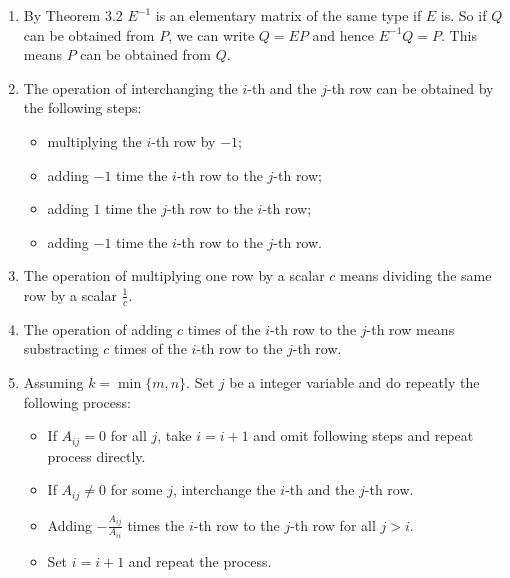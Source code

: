 \begin{enumerate}
\item By Theorem 3.2 $E^{-1}$ is an elementary matrix of the same type if $E$ is. So if $Q$ can be obtained from $P$, we can write $Q=EP$ and hence $E^{-1}Q=P$. This means $P$ can be obtained from $Q$.
\item The operation of interchanging the $i$-th and the $j$-th row can be obtained by the following steps:\begin{itemize}
\item multiplying the $i$-th row by $-1$;
\item adding $-1$ time the $i$-th row to the $j$-th row;
\item adding $1$ time the $j$-th row to the $i$-th row;
\item adding $-1$ time the $i$-th row to the $j$-th row.
\end{itemize}
\item The operation of multiplying one row by a scalar $c$ means dividing the same row by a scalar $\frac{1}{c}$.
\item The operation of adding $c$ times of the $i$-th row to the $j$-th row means substracting $c$ times of the $i$-th row to the $j$-th row.
\item Assuming $k=\min\{m,n\}$. Set $j$ be a integer variable and do repeatly the following process:\begin{itemize}
\item If $A_{ij}=0$ for all $j$, take $i=i+1$ and omit following steps and repeat process directly.
\item If $A_{ij}\neq 0$ for some $j$, interchange the $i$-th and the $j$-th row.
\item Adding $-\frac{A_{ij}}{A_{ii}}$ times the $i$-th row to the $j$-th row for all $j>i$.
\item Set $i=i+1$ and repeat the process.
\end{itemize}
\end{enumerate}